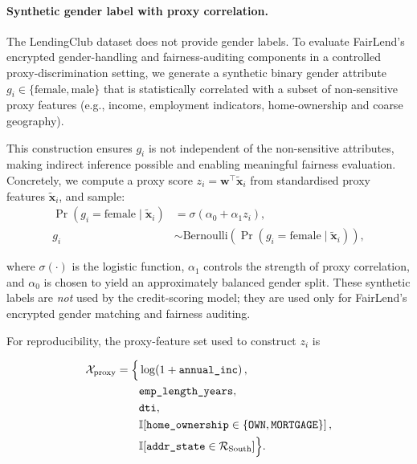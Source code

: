 \documentclass[a4paper,fleqn]{cas-dc}
\begin{document}
\paragraph{Synthetic gender label with proxy correlation.}
The LendingClub dataset does not provide gender labels. To evaluate FairLend’s encrypted gender-handling and fairness-auditing components in a controlled proxy-discrimination setting, we generate a synthetic binary gender attribute $g_i \in \{\text{female}, \text{male}\}$ that is statistically correlated with a subset of non-sensitive proxy features (e.g., income, employment indicators, home-ownership and coarse geography). 

This construction ensures $g_i$ is not independent of the non-sensitive attributes, making indirect inference possible and enabling meaningful fairness evaluation. Concretely, we compute a proxy score $z_i = \mathbf{w}^\top \tilde{\mathbf{x}}_i$ from standardised proxy features $\tilde{\mathbf{x}}_i$, and sample:
\begin{equation*}
\begin{aligned}
\Pr(g_i=\text{female}\mid \tilde{\mathbf{x}}_i) &= \sigma(\alpha_0+\alpha_1 z_i), \\
g_i &\sim \mathrm{Bernoulli}\!\left(\Pr(g_i=\text{female}\mid \tilde{\mathbf{x}}_i)\right),
\end{aligned}
\end{equation*}

where $\sigma(\cdot)$ is the logistic function, $\alpha_1$ controls the strength of proxy correlation, and $\alpha_0$ is chosen to yield an approximately balanced gender split. These synthetic labels are \emph{not} used by the credit-scoring model; they are used only for FairLend’s encrypted gender matching and fairness auditing. 


For reproducibility, the proxy-feature set used to construct $z_i$ is


\[
\begin{aligned}
\mathcal{X}_{\mathrm{proxy}}
=
\Bigl\{
    &\log\!\left(1+\texttt{annual\_inc}\right), \\
    &\texttt{emp\_length\_years}, \\
    &\texttt{dti}, \\
    &\mathbb{I}\!\left[
        \texttt{home\_ownership}
        \in
        \{\texttt{OWN},\texttt{MORTGAGE}\}
    \right], \\
    &\mathbb{I}\!\left[
        \texttt{addr\_state}
        \in
        \mathcal{R}_{\mathrm{South}}
    \right]
\Bigr\}.
\end{aligned}
\]
\end{document}
